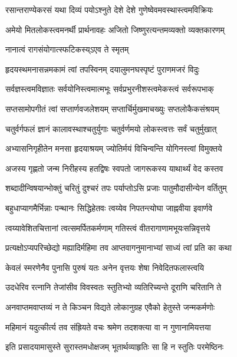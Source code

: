 \twolineshloka
{रसान्तराण्येकरसं यथा दिव्यं पयोऽश्नुते}
{देशे देशे गुणेष्वेवमवस्थास्त्वमविक्रियः} %

\twolineshloka
{अमेयो मितलोकस्त्वमनर्थी प्रार्थनावहः}
{अजितो जिष्णुरत्यन्तमव्यक्तो व्यक्तकारणम्} %

{नानात्वं रागसंयोगात्स्फटिकस्य्ऽएव ते स्मृतम्} %

\twolineshloka
{हृदयस्थमनासन्नमकामं त्वां तपस्विनम्}
{दयालुमनघस्पृष्टं पुराणमजरं विदुः} %

\twolineshloka
{सर्वज्ञस्त्वमविज्ञातः सर्वयोनिस्त्वमात्मभूः}
{सर्वप्रभुरनीशस्त्वमेकस्त्वं सर्वरूपभाक्} %

\twolineshloka
{सप्तसामोपगीतं त्वां सप्तार्णवजलेशयम्}
{सप्तार्चिर्मुखमाचख्युः सप्तलोकैकसंश्रयम्} %

\twolineshloka
{चतुर्वर्गफलं ज्ञानं कालावस्थाश्चतुर्युगाः}
{चतुर्वर्णमयो लोकस्त्वत्तः सर्वं चतुर्मुखात्} %

\twolineshloka
{अभ्यासनिगृहीतेन मनसा हृदयाश्रयम्}
{ज्योतिर्मयं विचिन्वन्ति योगिनस्त्वां विमुक्तये} %

\twolineshloka
{अजस्य गृह्णतो जन्म निरीहस्य हतद्विषः}
{स्वपतो जागरूकस्य याथार्थ्यं वेद कस्तव} %

\twolineshloka
{शब्दादीन्विषयान्भोक्तुं चरितुं दुश्चरं तपः}
{पर्याप्तोऽसि प्रजाः पातुमौदासीन्येन वर्तितुम्} %

\twolineshloka
{बहुधाप्यागमैर्भिन्नाः पन्थानः सिद्धिहेतवः}
{त्वय्येव निपतन्त्योघा जाह्नवीया इवार्णवे} %

\twolineshloka
{त्वय्यावेशितचित्तानां त्वत्समर्पितकर्मणाम्}
{गतिस्त्वं वीतरागाणामभूयःसन्निवृत्तये} %

\twolineshloka
{प्रत्यक्षोऽप्यपरिच्छेद्यो मह्यादिर्महिमा तव}
{आप्तवागनुमानाभ्यां साध्यं त्वां प्रति का कथा} %

\twolineshloka
{केवलं स्मरणेनैव पुनासि पुरुषं यतः}
{अनेन वृत्तयः शेषा निवेदितफलास्त्वयि} %

\twolineshloka
{उदधेरिव रत्नानि तेजांसीव विवस्वतः}
{स्तुतिभ्यो व्यतिरिच्यन्ते दूराणि चरितानि ते} %

\twolineshloka
{अनवाप्तमवाप्तव्यं न ते किञ्चन विद्यते}
{लोकानुग्रह एवैको हेतुस्ते जन्मकर्मणोः} %

\twolineshloka
{महिमानं यदुत्कीर्त्य तव संह्रियते वचः}
{श्रमेण तदशक्त्या वा न गुणानामियत्तया} %

\twolineshloka
{इति प्रसादयामासुस्ते सुरास्तमधोक्षजम्}
{भूतार्थव्याहृतिः सा हि न स्तुतिः परमेष्ठिनः} %


